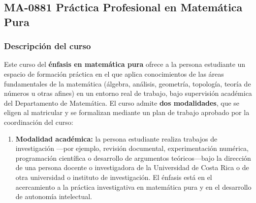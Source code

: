 \newpage
\subsection*{MA-0881 Práctica Profesional en Matemática Pura}

\hypertarget{MA0881Pura}{}
\begin{refsection}
\begin{table}[H]
\end{table}

\subsubsection*{Descripción del curso}

Este curso del \textbf{énfasis en matemática pura} ofrece a la persona estudiante un espacio de formación práctica en el que aplica conocimientos de las áreas fundamentales de la matemática (álgebra, análisis, geometría, topología, teoría de números u otras afines) en un entorno real de trabajo, bajo supervisión académica del Departamento de Matemática. El curso admite \textbf{dos modalidades}, que se eligen al matricular y se formalizan mediante un plan de trabajo aprobado por la coordinación del curso:

\begin{enumerate}
\item \textbf{Modalidad académica:} la persona estudiante realiza trabajos de investigación ---por ejemplo, revisión documental, experimentación numérica, programación científica o desarrollo de argumentos teóricos---bajo la dirección de una persona docente o investigadora de la Universidad de Costa Rica o de otra universidad o instituto de investigación. El énfasis está en el acercamiento a la práctica investigativa en matemática pura y en el desarrollo de autonomía intelectual.


\end{enumerate}
\end{refsection}
